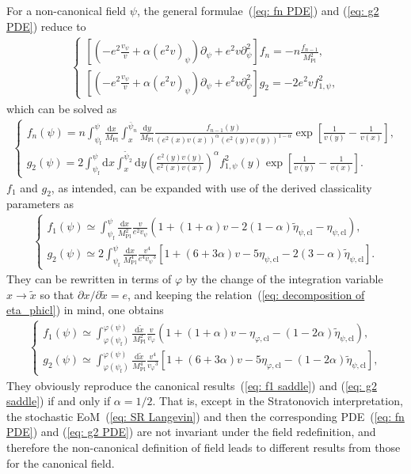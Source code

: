 \documentclass[aps, prd
, preprint
, nofootinbib 
, superscriptaddress
, longbibliography
]{revtex4-1}
\newcommand{\dd}{\mathrm{d}}
\newcommand{\Mpl}{M_\text{Pl}}
\newcommand{\dps}{\displaystyle}
\newcommand{\cl}{\text{cl}}
\newcommand{\uf}{\text{f}}
\newcommand{\bae}[1]{\begin{align} #1 \end{align}}
\newcommand{\bce}[1]{\begin{cases} #1 \end{cases}}
\begin{document}
For a non-canonical field $\psi$, the general formulae~(\ref{eq: fn PDE}) and (\ref{eq: g2 PDE}) reduce to
\bae{
	\bce{
		\dps
		\left[\left(-e^2\frac{v_\psi}{v}+\alpha(e^2v)_\psi\right)\partial_\psi+e^2v\partial_\psi^2\right]f_n=-n\frac{f_{n-1}}{\Mpl^2}, \\[10pt]
		\dps
		\left[\left(-e^2\frac{v_\psi}{v}+\alpha(e^2v)_\psi\right)\partial_\psi+e^2v\partial_\psi^2\right]g_2=-2e^2v{f_{1,\psi}^2},
	}
}
which can be solved as
\bae{\label{eq: general fn and g2}
	\bce{
		\dps
		f_n(\psi)=n\int^\psi_{\psi_\uf}\frac{\dd x}{\Mpl}\int^{\bar{\psi}_n}_x\frac{\dd y}{\Mpl}\frac{f_{n-1}(y)}{(e^2(x)v(x))^\alpha(e^2(y)v(y))^{1-\alpha}}
		\exp\left[\frac{1}{v(y)}-\frac{1}{v(x)}\right], \\[10pt]
		\dps
		g_2(\psi)=2\int^\psi_{\psi_\uf}\dd x\int^{\tilde{\psi}_2}_x\dd y\left(\frac{e^2(y)v(y)}{e^2(x)v(x)}\right)^\alpha{f_{1,\psi}^2}(y)
		\exp\left[\frac{1}{v(y)}-\frac{1}{v(x)}\right].
	}
}
$f_1$ and $g_2$, as intended, can be expanded with use of the derived classicality parameters as
\bae{
	\bce{
		\dps
		f_1(\psi)\simeq\int^\psi_{\psi_\uf}\frac{\dd x}{\Mpl^2}\frac{v}{e^2v_\psi}\left(1+(1+\alpha)v-2(1-\alpha)\tilde{\eta}_{\psi,\cl}-\eta_{\psi,\cl}\right), \\[10pt]
		\dps
		g_2(\psi)\simeq2\int^\psi_{\psi_\uf}\frac{\dd x}{\Mpl^4}\frac{v^4}{e^4{v_\psi}^3}\left[1+(6+3\alpha)v-5\eta_{\psi,\cl}-2(3-\alpha)\tilde{\eta}_{\psi,\cl}\right].
	}
}
They can be rewritten in terms of $\varphi$ by the change of the integration variable $x\to\tilde{x}$ so that $\partial x/\partial\tilde{x}=e$, 
and keeping the relation~(\ref{eq: decomposition of eta_phicl}) in mind, one obtains
\bae{
	\bce{
		\dps
		f_1(\psi)\simeq\int^{\varphi(\psi)}_{\varphi(\psi_\uf)}\frac{\dd\tilde{x}}{\Mpl^2}\frac{v}{v_\varphi}
		\left(1+(1+\alpha)v-\eta_{\varphi,\cl}-(1-2\alpha)\tilde{\eta}_{\psi,\cl}\right), \\[10pt]
		\dps
		g_2(\psi)\simeq\int^{\varphi(\psi)}_{\varphi(\psi_\uf)}\frac{\dd\tilde{x}}{\Mpl^4}\frac{v^4}{{v_\varphi}^3}\left[1+(6+3\alpha)v-5\eta_{\varphi,\cl}
		-(1-2\alpha)\tilde{\eta}_{\psi,\cl}\right],
	}
}
They obviously reproduce the canonical results~(\ref{eq: f1 saddle}) and (\ref{eq: g2 saddle}) if and only if $\alpha=1/2$.
That is, except in the Stratonovich interpretation, the stochastic EoM~(\ref{eq: SR Langevin}) and then the corresponding PDE~(\ref{eq: fn PDE}) and (\ref{eq: g2 PDE})
are not invariant under the field redefinition, and therefore the non-canonical definition of field leads to different results from those for the canonical field.
\end{document}
